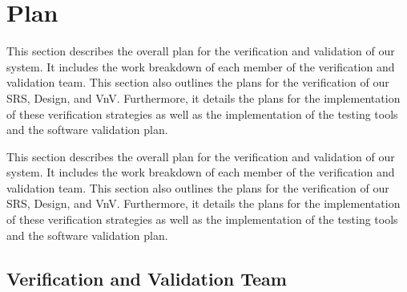 \documentclass[12pt, titlepage]{article}
\begin{document}
\section{Plan}

This section describes the overall plan for the verification and validation of our system. It includes the work breakdown 
of each member of the verification and validation team. This section also outlines the plans for the verification of 
our SRS, Design, and VnV. Furthermore, it details the plans for the implementation of these verification strategies as well as 
the implementation of the testing tools and the software validation plan.

This section describes the overall plan for the verification and validation of our system. It includes the work breakdown 
of each member of the verification and validation team. This section also outlines the plans for the verification of 
our SRS, Design, and VnV. Furthermore, it details the plans for the implementation of these verification strategies as well as 
the implementation of the testing tools and the software validation plan.

\subsection{Verification and Validation Team}
\end{document}
